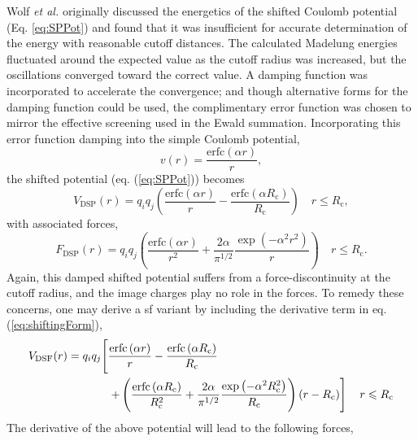 \documentclass[]{book}
\begin{document}
Wolf \textit{et al.} originally discussed the energetics of the
shifted Coulomb potential (Eq. \ref{eq:SPPot}) and found that it was
insufficient for accurate determination of the energy with reasonable
cutoff distances.  The calculated Madelung energies fluctuated around
the expected value as the cutoff radius was increased, but the
oscillations converged toward the correct value.\cite{Wolf99} A
damping function was incorporated to accelerate the convergence; and
though alternative forms for the damping function could be
used,\cite{Jones56,Heyes81} the complimentary error function was
chosen to mirror the effective screening used in the Ewald summation.
Incorporating this error function damping into the simple Coulomb
potential,
\begin{equation}
v(r) = \frac{\mathrm{erfc}\left(\alpha r\right)}{r},
\label{eq:dampCoulomb}
\end{equation}
the shifted potential (eq. (\ref{eq:SPPot})) becomes
\begin{equation}
V_{\textrm{DSP}}(r) = q_iq_j\left(\frac{\textrm{erfc}\left(\alpha r\right)}{r}-\frac{\textrm{erfc}\left(\alpha R_\textrm{c}\right)}{R_\textrm{c}}\right) \quad r
\leqslant R_\textrm{c},
\label{eq:DSPPot}
\end{equation}
with associated forces,
\begin{equation}
F_{\textrm{DSP}}(r) = q_iq_j\left(\frac{\textrm{erfc}\left(\alpha r\right)}{r^2}
+\frac{2\alpha}{\pi^{1/2}}\frac{\exp{\left(-\alpha^2r^2\right)}}{r}\right) \quad
 r\leqslant R_\textrm{c}.
\label{eq:DSPForces}
\end{equation}
Again, this damped shifted potential suffers from a
force-discontinuity at the cutoff radius, and the image charges play
no role in the forces.  To remedy these concerns, one may derive a
{\sc sf} variant by including the derivative term in
eq. (\ref{eq:shiftingForm}),
\begin{equation}
\begin{split}
V_\mathrm{DSF}(r) = q_iq_j\Biggr{[} & \frac{\mathrm{erfc}\left(\alpha r \right)}{r} -\frac{\mathrm{erfc}\left(\alpha R_\mathrm{c} \right) }{R_\mathrm{c}} \\
 & \left. +\left(\frac{\mathrm{erfc}\left(\alpha
R_\mathrm{c}\right)}{R_\mathrm{c}^2}+\frac{2\alpha}{\pi^{1/2}}\frac{\exp\left(-\alpha^2R_\mathrm{c}^2\right)}{R_\mathrm{c}}\right)\left(r-R_\mathrm{c}\right)
\right] \quad r\leqslant R_\textrm{c} 
\label{eq:DSFPot}
\end{split}
\end{equation}
The derivative of the above potential will lead to the following forces,
\end{document}
